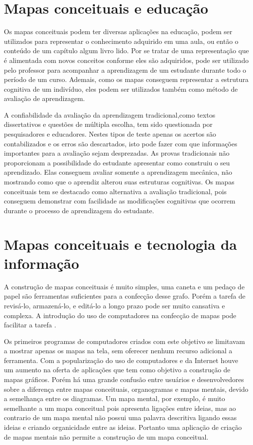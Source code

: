 \documentclass[
	12pt,				%
	openright,			%
	oneside,			%
	a4paper,			%
	english,			%
	french,				%
	spanish,			%
	brazil				%
	]{abntex2}
\begin{document}
\section{Mapas conceituais e educação}\label{sec-mapeduc}

Os mapas conceituais podem ter diversas aplicações na educação, podem ser utilizados para representar o conhecimento adquirido em uma aula, ou então o conteúdo de um capítulo algum livro lido. Por se tratar de uma representação que é alimentada com novos conceitos conforme eles são adquiridos, pode ser utilizado pelo professor para acompanhar a aprendizagem de um estudante durante todo o período de um curso. Ademais, como os mapas conseguem representar a estrutura cognitiva de um indivíduo, eles podem ser utilizados também como método de avaliação de aprendizagem\cite{Perin2014}.

A confiabilidade da avaliação da aprendizagem tradicional,como textos dissertativos e questões de múltipla escolha, tem sido questionada por pesquisadores e educadores. Nestes tipos de teste apenas os acertos são contabilizados e os erros são descartados, isto pode fazer com que informações importantes para a avaliação sejam desprezadas.
As provas tradicionais não proporcionam a possibilidade do estudante apresentar como construiu o seu aprendizado. Elas conseguem avaliar somente a aprendizagem mecânica, não mostrando como que o aprendiz alterou suas estruturas cognitivas.
Os mapas conceituais tem se destacado como alternativa a avaliação tradicional, pois conseguem demonstrar com facilidade as modificações cognitivas que ocorrem durante o processo de aprendizagem do estudante\cite{Dutra2002}.

\section{Mapas conceituais e tecnologia da informação}

A construção de mapas conceituais é muito simples, uma caneta e um pedaço de papel são ferramentas suficientes para a confecção desse grafo. Porém a tarefa de revisá-lo, armazená-lo, e editá-lo a longo prazo  pode ser muito cansativa e complexa. A introdução do uso de computadores na confecção de mapas pode facilitar a tarefa \cite{Novak2006}.

Os primeiros programas de computadores criados com este objetivo se limitavam a mostrar apenas os mapas na tela, sem oferecer nenhum recurso adicional a ferramenta. Com a popularização do uso de computadores e da Internet houve um aumento na oferta de aplicações que tem como objetivo a construção de mapas gráficos. Porém há uma grande confusão entre usuários e desenvolvedores sobre a diferença entre mapas conceituais, organogramas e mapas mentais, devido a semelhança entre os diagramas\cite{Perin2014}. Um mapa mental, por exemplo, é muito semelhante a um mapa conceitual pois apresenta ligações entre ideias, mas ao contrario de um mapa mental não possui uma palavra descritiva ligando essas ideias e criando organicidade entre as ideias. Portanto uma aplicação de criação de mapas mentais não permite a construção de um mapa conceitual. 
\end{document}

